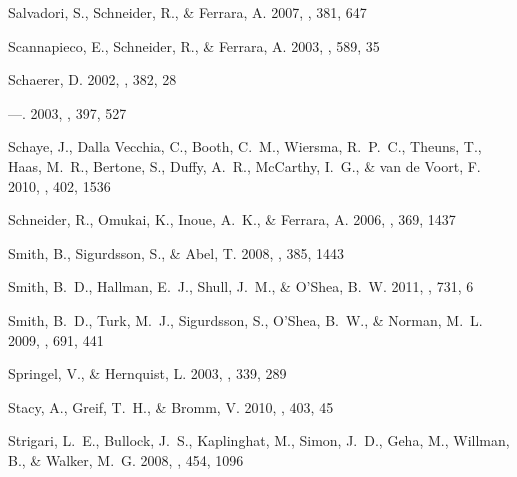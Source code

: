 \documentclass[12pt,preprint]{aastex}
\begin{document}
\begin{thebibliography}{108}
{Salvadori}, S., {Schneider}, R., \& {Ferrara}, A. 2007, \mnras, 381, 647

{Scannapieco}, E., {Schneider}, R., \& {Ferrara}, A. 2003, \apj, 589, 35

{Schaerer}, D. 2002, \aap, 382, 28

---. 2003, \aap, 397, 527

{Schaye}, J., {Dalla Vecchia}, C., {Booth}, C.~M., {Wiersma}, R.~P.~C.,
  {Theuns}, T., {Haas}, M.~R., {Bertone}, S., {Duffy}, A.~R., {McCarthy},
  I.~G., \& {van de Voort}, F. 2010, \mnras, 402, 1536

{Schneider}, R., {Omukai}, K., {Inoue}, A.~K., \& {Ferrara}, A. 2006, \mnras,
  369, 1437

{Smith}, B., {Sigurdsson}, S., \& {Abel}, T. 2008, \mnras, 385, 1443

{Smith}, B.~D., {Hallman}, E.~J., {Shull}, J.~M., \& {O'Shea}, B.~W. 2011,
  \apj, 731, 6

{Smith}, B.~D., {Turk}, M.~J., {Sigurdsson}, S., {O'Shea}, B.~W., \& {Norman},
  M.~L. 2009, \apj, 691, 441

{Springel}, V., \& {Hernquist}, L. 2003, \mnras, 339, 289

{Stacy}, A., {Greif}, T.~H., \& {Bromm}, V. 2010, \mnras, 403, 45

{Strigari}, L.~E., {Bullock}, J.~S., {Kaplinghat}, M., {Simon}, J.~D., {Geha},
  M., {Willman}, B., \& {Walker}, M.~G. 2008, \nat, 454, 1096


\end{thebibliography}
\end{document}
